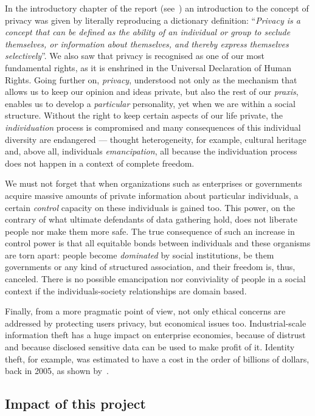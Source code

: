 In the introductory chapter of the report (see~) an introduction to the concept of privacy was given by literally reproducing a dictionary definition: ``\textit{Privacy is a concept that can be defined as the ability of an individual or group to seclude themselves, or information about themselves, and thereby express themselves selectively}''. We also saw that privacy is recognised as one of our most fundamental rights, as it is enshrined in the Universal Declaration of Human Rights. Going further on, \textit{privacy}, understood not only as the mechanism that allows us to keep our opinion and ideas private, but also the rest of our \textit{praxis}, enables us to develop a \textit{particular} personality, yet when we are within a social structure. Without the right to keep certain aspects of our life private, the \textit{individuation} process is compromised and many consequences of this individual diversity are endangered --- thought heterogeneity, for example, cultural heritage and, above all, individuals \textit{emancipation}, all because the individuation process does not happen in a context of complete freedom.

We must not forget that when organizations such as enterprises or governments acquire massive amounts of private information about particular individuals, a certain \textit{control} capacity on these individuals is gained too. This power, on the contrary of what ultimate defendants of data gathering hold, does not liberate people nor make them more safe. The true consequence of such an increase in control power is that all equitable bonds between individuals and these organisms are torn apart: people become \textit{dominated} by social institutions, be them governments or any kind of structured association, and their freedom is, thus, canceled. There is no possible emancipation nor conviviality of people in a social context if the individuals-society relationships are domain based.

Finally, from a more pragmatic point of view, not only ethical concerns are addressed by protecting users privacy, but economical issues too. Industrial-scale information theft has a huge impact on enterprise economies, because of distrust and because disclosed sensitive data can be used to make profit of it. Identity theft, for example, was estimated to have a cost in the order of billions of dollars, back in 2005, as shown by~\citet{Romanosky:DisclosureLaws}.

\subsection{Impact of this project}
\label{Practical::Privacy:Impact}

